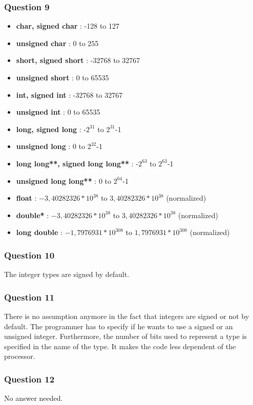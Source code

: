 \documentclass[a4paper,10pt]{article}
\begin{document}
\subsubsection*{Question 9}
\begin{itemize}[itemsep=0pt] 
 \item \textbf{char, signed char} : -128 to 127
 \item \textbf{unsigned char} : 0 to 255
 \item \textbf{short, signed short} : -32768 to 32767
 \item \textbf{unsigned short} : 0 to 65535
 \item \textbf{int, signed int} : -32768 to 32767
 \item \textbf{unsigned int} : 0 to 65535
 \item \textbf{long, signed long} : -$2^{31}$ to $2^{31}$-1
 \item \textbf{unsigned long} : 0 to $2^{32}$-1
 \item \textbf{long long**, signed long long**} : -$2^{63}$ to $2^{63}$-1
 \item \textbf{unsigned long long**} : 0 to $2^{64}$-1
 \item \textbf{float} : $-3,40282326*10^{38}$ to $3,40282326*10^{38}$ (normalized)
 \item \textbf{double*} : $-3,40282326*10^{38}$ to $3,40282326*10^{38}$ (normalized)
 \item \textbf{long double} : $-1,7976931*10^{308}$ to $1,7976931*10^{308}$ (normalized)
\end{itemize}

\subsubsection*{Question 10}
The integer types are signed by default.

\subsubsection*{Question 11}
There is no assumption anymore in the fact that integers are signed or not by default. The programmer has to specify if he wants to use a signed or an unsigned integer. Furthermore, the number of bits used to represent a type is specified in the name of the type. It makes the code less dependent of the processor.

\subsubsection*{Question 12}
No answer needed.
\end{document}
